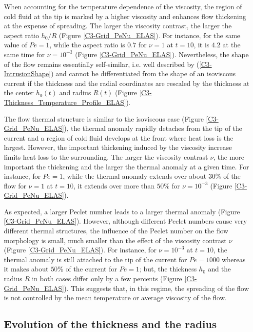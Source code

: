 When accounting for  the temperature dependence of  the viscosity, the
region of cold  fluid at the tip  is marked by a  higher viscosity and
enhances flow thickening at the  expense of spreading.  The larger the
viscosity  contrast,  the  larger  the aspect  ratio  $h_0/R$  (Figure
\ref{C3-Grid_PeNu_ELAS}).  For instance, for the same value of $Pe=1$,
while the aspect ratio is $0.7$ for  $\nu=1$ at $t=10$, it is $4.2$ at
the  same  time  for $\nu=10^{-3}$  (Figure  \ref{C3-Grid_PeNu_ELAS}).
Nevertheless, the shape of  the flow remains essentially self-similar,
i.e.   well  described  by  (\ref{C3-IntrusionShape})  and  cannot  be
differentiated  from  the  shape  of  an  isoviscous  current  if  the
thickness and the radial coordinates  are rescaled by the thickness at
the     center     $h_0(t)$      and     radius     $R(t)$     (Figure
\ref{C3-Thickness_Temperature_Profile_ELAS}).

The flow thermal  structure is similar to the  isoviscous case (Figure
\ref{C3-Grid_PeNu_ELAS}),  the thermal  anomaly rapidly  detaches from
the tip  of the  current and a  region of cold  fluid develops  at the
front  where  heat  loss  is   the  largest.  However,  the  important
thickening induced by  the viscosity increase limits heat  loss to the
surrounding.   The  larger  the  viscosity contrast  $\nu$,  the  more
important the thickening and the larger the thermal anomaly at a given
time.  For  instance, for  $Pe=1$, while  the thermal  anomaly extends
over about $30\%$  of the flow for $\nu=1$ at  $t=10$, it extends over
more than $50\%$ for $\nu=10^{-3}$ (Figure \ref{C3-Grid_PeNu_ELAS}).

As expected, a larger Peclet number  leads to a larger thermal anomaly
(Figure \ref{C3-Grid_PeNu_ELAS}).  However,  although different Peclet
numbers cause very different thermal  structures, the influence of the
Peclet number on  the flow morphology is small, much  smaller than the
effect     of     the     viscosity     contrast     $\nu$     (Figure
\ref{C3-Grid_PeNu_ELAS}).  For instance,  for $\nu=10^{-3}$ at $t=10$,
the thermal  anomaly is still attached  to the tip of  the current for
$Pe = 1000$  whereas it makes about $50\%$ of  the current for $Pe=1$;
but, the thickness $h_0$ and the  radius $R$ in both cases differ only
by  a few  percents (Figure  \ref{C3-Grid_PeNu_ELAS}).  This  suggests
that, in this  regime, the spreading of the flow  is not controlled by
the mean temperature or average viscosity of the flow.
  
\subsection{Evolution of the thickness and the radius}
\label{C3-sec:evol-thickn-radi-e}

